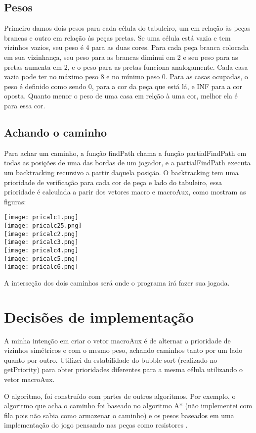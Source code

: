 \documentclass[12pt, a4paper]{article} %
\begin{document}
	\subsection{Pesos}
		\par Primeiro damos dois pesos para cada célula do tabuleiro, um em relação às peças brancas e outro em relação às peças pretas. Se uma célula está vazia e tem vizinhos vazios, seu peso é 4 para as duas cores. Para cada peça branca colocada em sua vizinhança, seu peso para as brancas diminui em 2 e seu peso para as pretas aumenta em 2, e o peso para as pretas funciona analogamente. Cada casa vazia pode ter no máximo peso 8 e no mínimo peso 0. Para as casas ocupadas, o peso é definido como sendo 0, para a cor da peça que está lá, e INF para a cor oposta. Quanto menor o peso de uma casa em relção à uma cor, melhor ela é para essa cor.
	\subsection{Achando o caminho}
		\par Para achar um caminho, a função findPath chama a função partialFindPath em todas as posições de uma das bordas de um jogador, e a partialFindPath executa um backtracking recursivo a partir daquela posição. O backtracking tem uma prioridade de verificação para cada cor de peça e lado do tabuleiro, essa prioridade é calculada a parir dos vetores macro e macroAux, como mostram as figuras:
		\begin{center}
		\texttt{[image: pricalc1.png]}\\
		\texttt{[image: pricalc25.png]}\\
		\texttt{[image: pricalc2.png]}\\
		\texttt{[image: pricalc3.png]}\\
		\texttt{[image: pricalc4.png]}\\
		\texttt{[image: pricalc5.png]}\\
		\texttt{[image: pricalc6.png]}\\
		\end{center}
		\par A interseção dos dois caminhos será onde o programa irá fazer sua jogada.

\section{Decisões de implementação}
	\par A minha intenção em criar o vetor macroAux é de alternar a prioridade de vizinhos simétricos e com o mesmo peso, achando caminhos tanto por um lado quanto por outro. Utilizei da estabilidade do bubble sort (realizado no getPriority) para obter prioridades diferentes para a mesma célula utilizando o vetor macroAux.
	\par O algoritmo, foi construído com partes de outros algoritmos. Por exemplo, o algoritmo que acha o caminho foi baseado no algoritmo A* (não implementei com fila pois não sabia como armazenar o caminho) e os pesos baseados em uma implementação do jogo pensando nas peças como resistores \cite{hexy}.
\end{document}
